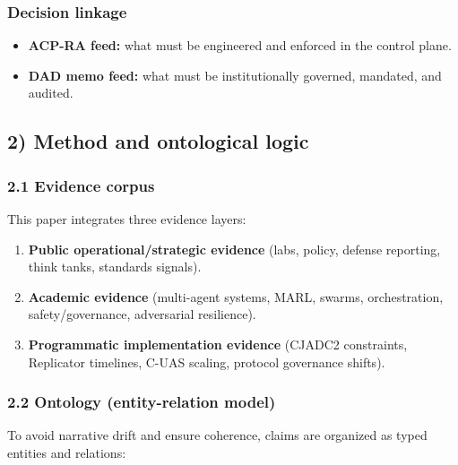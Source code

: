 \documentclass[11pt]{article}
\begin{document}
\hypertarget{decision-linkage}{%
\subsubsection{Decision linkage}\label{decision-linkage}}

\begin{itemize}
\tightlist
\item
  \textbf{ACP-RA feed:} what must be engineered and enforced in the
  control plane.
\item
  \textbf{DAD memo feed:} what must be institutionally governed,
  mandated, and audited.
\end{itemize}

\hypertarget{method-and-ontological-logic}{%
\subsection{2) Method and ontological
logic}\label{method-and-ontological-logic}}

\hypertarget{evidence-corpus}{%
\subsubsection{2.1 Evidence corpus}\label{evidence-corpus}}

This paper integrates three evidence layers:

\begin{enumerate}
\def\labelenumi{\arabic{enumi}.}
\tightlist
\item
  \textbf{Public operational/strategic evidence} (labs, policy, defense
  reporting, think tanks, standards signals).
\item
  \textbf{Academic evidence} (multi-agent systems, MARL, swarms,
  orchestration, safety/governance, adversarial resilience).
\item
  \textbf{Programmatic implementation evidence} (CJADC2 constraints,
  Replicator timelines, C-UAS scaling, protocol governance shifts).
\end{enumerate}

\hypertarget{ontology-entity-relation-model}{%
\subsubsection{2.2 Ontology (entity-relation
model)}\label{ontology-entity-relation-model}}

To avoid narrative drift and ensure coherence, claims are organized as
typed entities and relations:
\end{document}
